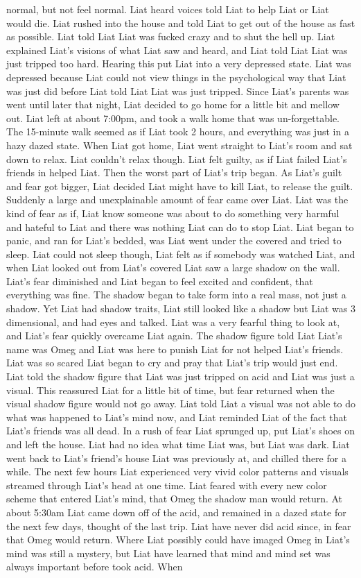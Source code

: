 \documentclass[12pt]{book}
\begin{document}
normal, but not feel normal. Liat heard voices told Liat to help Liat or Liat would die. Liat rushed into the house and told Liat to get out of the house as fast as possible. Liat told Liat Liat was fucked crazy and to shut the hell up. Liat explained Liat's visions of what Liat saw and heard, and Liat told Liat Liat was just tripped too hard. Hearing this put Liat into a very depressed state. Liat was depressed because Liat could not view things in the psychological way that Liat was just did before Liat told Liat Liat was just tripped. Since Liat's parents was went until later that night, Liat decided to go home for a little bit and mellow out. Liat left at about 7:00pm, and took a walk home that was un-forgettable. The 15-minute walk seemed as if Liat took 2 hours, and everything was just in a hazy dazed state. When Liat got home, Liat went straight to Liat's room and sat down to relax. Liat couldn't relax though. Liat felt guilty, as if Liat failed Liat's friends in helped Liat. Then the worst part of Liat's trip began. As Liat's guilt and fear got bigger, Liat decided Liat might have to kill Liat, to release the guilt. Suddenly a large and unexplainable amount of fear came over Liat. Liat was the kind of fear as if, Liat know someone was about to do something very harmful and hateful to Liat and there was nothing Liat can do to stop Liat. Liat began to panic, and ran for Liat's bedded, was Liat went under the covered and tried to sleep. Liat could not sleep though, Liat felt as if somebody was watched Liat, and when Liat looked out from Liat's covered Liat saw a large shadow on the wall. Liat's fear diminished and Liat began to feel excited and confident, that everything was fine. The shadow began to take form into a real mass, not just a shadow. Yet Liat had shadow traits, Liat still looked like a shadow but Liat was 3 dimensional, and had eyes and talked. Liat was a very fearful thing to look at, and Liat's fear quickly overcame Liat again. The shadow figure told Liat Liat's name was Omeg and Liat was here to punish Liat for not helped Liat's friends. Liat was so scared Liat began to cry and pray that Liat's trip would just end. Liat told the shadow figure that Liat was just tripped on acid and Liat was just a visual. This reassured Liat for a little bit of time, but fear returned when the visual shadow figure would not go away. Liat told Liat a visual was not able to do what was happened to Liat's mind now, and Liat reminded Liat of the fact that Liat's friends was all dead. In a rush of fear Liat sprunged up, put Liat's shoes on and left the house. Liat had no idea what time Liat was, but Liat was dark. Liat went back to Liat's friend's house Liat was previously at, and chilled there for a while. The next few hours Liat experienced very vivid color patterns and visuals streamed through Liat's head at one time. Liat feared with every new color scheme that entered Liat's mind, that Omeg the shadow man would return. At about 5:30am Liat came down off of the acid, and remained in a dazed state for the next few days, thought of the last trip. Liat have never did acid since, in fear that Omeg would return. Where Liat possibly could have imaged Omeg in Liat's mind was still a mystery, but Liat have learned that mind and mind set was always important before took acid. When 
\end{document}
